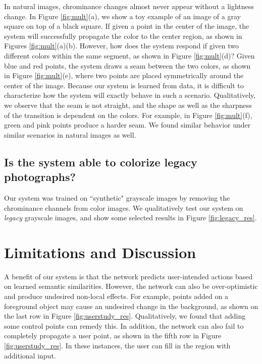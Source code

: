 \documentclass[acmtog,authorversion]{acmart}
\begin{document}
In natural images, chrominance changes almost never appear without a lightness change. In Figure \ref{fig:mult}(a), we show a toy example of an image of a gray square on top of a black square. If given a  point in the center of the image, the system will successfully propagate the color to the center region, as shown in Figures \ref{fig:mult}(a)(b). However, how does the system respond if given two different colors within the same segment, as shown in Figure \ref{fig:mult}(d)? Given blue and red points, the system draws a seam between the two colors, as shown in Figure \ref{fig:mult}(e), where two points are placed symmetrically around the center of the image. Because our system is learned from data, it is difficult to characterize how the system will exactly behave in such a scenario. Qualitatively, we observe that the seam is not straight, and the shape as well as the sharpness of the transition is dependent on the colors. For example, in Figure \ref{fig:mult}(f), green and pink points produce a harder seam. We found similar behavior under similar scenarios in natural images as well.

\subsection{Is the system able to colorize legacy photographs?}
\label{sec:legacy}

Our system was trained on ``synthetic" grayscale images by removing the chrominance channels from color images. We qualitatively test our system on \textit{legacy} grayscale images, and show some selected results in Figure \ref{fig:legacy_res}.
 \section{Limitations and Discussion}

A benefit of our system is that the network predicts user-intended actions based on learned semantic similarities. However, the network can also be over-optimistic and produce undesired non-local effects. For example, points added on a foreground object may cause an undesired change in the background, as shown on the last row in Figure \ref{fig:userstudy_res}. Qualitatively, we found that adding some control points can remedy this. In addition, the network can also fail to completely propagate a user point, as shown in the fifth row in Figure \ref{fig:userstudy_res}. In these instances, the user can fill in the region with additional input.
\end{document}

